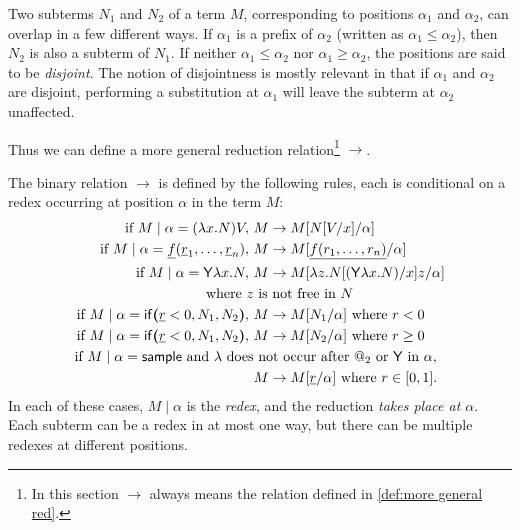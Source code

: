 Two subterms $N_1$ and $N_2$ of a term $M$, corresponding to positions $\alpha_1$ and $\alpha_2$, can overlap in a few different ways. 
If $\alpha_1$ is a prefix of $\alpha_2$ (written as $\alpha_1 \leq \alpha_2$), then $N_2$ is also a subterm of $N_1$. If neither $\alpha_1 \leq \alpha_2$ nor $\alpha_1 \geq \alpha_2$, the positions are said to be \emph{disjoint}. 
The notion of disjointness is mostly relevant in that if $\alpha_1$ and $\alpha_2$ are disjoint, performing a substitution at $\alpha_1$ will leave the subterm at $\alpha_2$ unaffected.

Thus we can define a more general reduction relation\footnote{In this section $\to$ always means the relation defined in \cref{def:more general red}.} $\to$.

\begin{definition}
\label{def:more general red}
The binary relation $\to$ is defined by the following rules, each is conditional on a redex occurring at position $\alpha$ in the term $M$:
\begin{align*}
  \text{if } M \mid \alpha = (\lambda x.N) V,\ & M \to M[N[V/x]/\alpha] \\
  \text{if } M \mid \alpha = \underline f (\underline r_1, \dots , \underline r_n),\ & M \to M[\underline{f(r_1,\dots,r_n)}/\alpha] \\
  \text{if } M \mid \alpha = \mathsf{Y} \lambda x. N,\ & M \to M[\lambda z. N[(\mathsf{Y} \lambda x. N)/x] z/\alpha]\\ \text{where }z&\text{ is not free in $N$}\\
  \text{if } M \mid \alpha = \mathsf{if}\boldsymbol{(}\underline r < 0, N_1, N_2\boldsymbol{)},\ & M \to M[N_1/\alpha] \text{ where }r < 0 \\
  \text{if } M \mid \alpha = \mathsf{if}\boldsymbol{(}\underline r < 0, N_1, N_2\boldsymbol{)},\ & M \to M[N_2/\alpha] \text{ where }r \geq 0 \\
  \text{if } M \mid \alpha = \mathsf{sample} \text{ and $\lambda$ does}&\text{ not occur after $@_2$ or $\mathsf{Y}$ in $\alpha$},\\ & M \to M[\underline r/\alpha] \text{ where } r \in [0,1].
\end{align*}
In each of these cases, $M \mid \alpha$ is the \emph{redex}, and the reduction \emph{takes place at $\alpha$}. Each subterm can be a redex in at most one way, but there can be multiple redexes at different positions.
\end{definition}

